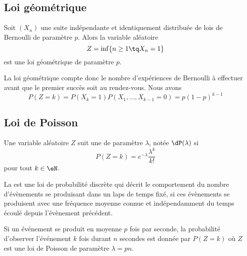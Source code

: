 \subsection{Loi géométrique}

Soit \( (X_n)\) une suite indépendante et identiquement distribuée de lois de Bernoulli de paramètre \( p\). Alors la variable aléatoire
\begin{equation}
    Z=\inf\{ n\geq 1\tq X_n=1 \}
\end{equation}
est une loi géométrique de paramètre \( p\).

La loi géométrique compte donc le nombre d'expériences de Bernoulli à effectuer avant que le premier succès soit au rendez-vous. Nous avons
\begin{equation}
    P(Z=k)=P(X_k=1)P(X_1,\ldots,X_{k-1}=0)=p(1-p)^{k-1}
\end{equation}

\subsection{Loi de Poisson}

Une variable aléatoire \( Z\) suit une  de paramètre \( \lambda\), notée \( \dP(\lambda)\) si
\begin{equation}
    P(Z=k)= e^{-\lambda}\frac{ \lambda^k }{ k! }
\end{equation}
pour tout \( k\in\eN\).

La  est une loi de probabilité discrète qui décrit le comportement du nombre d'évènements se produisant dans un laps de temps fixé, si ces évènements se produisent avec une fréquence moyenne connue et indépendamment du temps écoulé depuis l'évènement précédent. 

Si un événement se produit en moyenne \( p\) fois par seconde, la probabilité d'observer l'événement \( k\) fois durant \( n\) secondes est donnée par \( P(Z=k)\) où \( Z\) est une loi de Poisson de paramètre \( \lambda=pn\).

